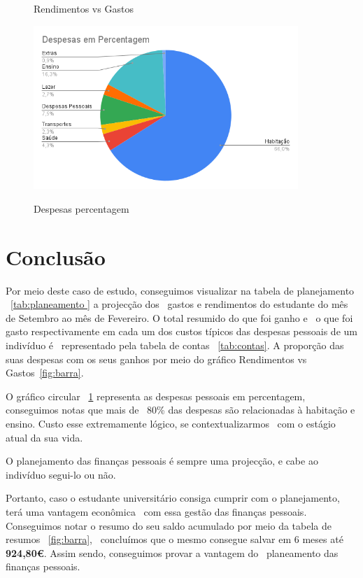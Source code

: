 \documentclass[a4paper,11pt]{report}
\begin{document}
\begin{center}
\begin{figure}[h]
\begin{center}
					\caption{Rendimentos vs Gastos}\label{fig:barra}
					\includegraphics[width=10cm]{./despesas_percentagem.png}
					\caption{Despesas percentagem}\label{fig:circular}
				\end{center}
			\end{figure}
			
		\end{center}


		\chapter{Conclusão}
		\begin{minipage}{\textwidth}
			\hspace{1cm} Por meio deste caso de estudo, conseguimos visualizar na tabela de planejamento ~\ref{tab:planeamento } a projecção dos \
			gastos e rendimentos do estudante do mês de Setembro ao mês de Fevereiro. O total resumido do que foi ganho e \
			o que foi gasto respectivamente em cada um dos custos típicos das despesas pessoais de um indivíduo é \
			representado pela tabela de contas ~\ref{tab:contas}. 
			A proporção das suas despesas com os seus ganhos por meio do gráfico Rendimentos vs Gastos~\ref{fig:barra}.
		\end{minipage}
		\begin{minipage}{\textwidth}
			\hspace{1cm} O gráfico circular ~\ref{fig:circular} representa as despesas pessoais em percentagem, conseguimos notas que mais de \
			80\% das despesas são relacionadas à habitação e ensino. Custo esse extremamente lógico, se contextualizarmos \
			com o estágio atual da sua vida.
		\end{minipage}
		\begin{minipage}{\textwidth}
			\hspace{1cm} O planejamento das finanças pessoais é sempre uma projecção, e cabe ao indivíduo segui-lo ou não.
			\vskip 0.01cm
		\end{minipage}
		\begin{minipage}{\textwidth}
			\hspace{1cm} Portanto, caso o estudante universitário consiga cumprir com o planejamento, terá uma vantagem econômica \
			com essa gestão das finanças pessoais. Conseguimos notar o resumo do seu saldo acumulado por meio da tabela de resumos ~\ref{fig:barra}, \
			concluímos que o mesmo consegue salvar em 6 meses até \textbf{924,80€}. Assim sendo, conseguimos provar a vantagem do \
			planeamento das finanças pessoais.
		\end{minipage}
\end{document}
